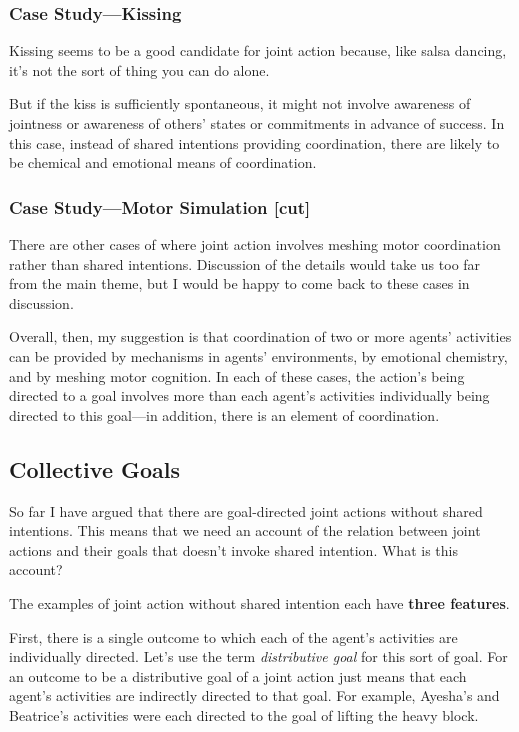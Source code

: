 \documentclass[14pt,a4paper]{extarticle}
\begin{document}
\subsubsection{Case Study---Kissing}
Kissing seems to be a good candidate for joint action because, like salsa dancing, it's not the sort of thing you can do alone.

But if the kiss is sufficiently spontaneous, it might not involve awareness of jointness or awareness of others' states or commitments in advance of success.  In this case, instead of shared intentions providing coordination, there are likely to be chemical and emotional means of coordination.



\subsubsection{Case Study---Motor Simulation [cut]}

There are other cases of where joint action involves meshing motor coordination rather than shared intentions.  Discussion of the details would take us too far from the main theme, but I would be happy to come back to these cases in discussion.

Overall, then, my suggestion is that coordination of two or more agents' activities can be provided by mechanisms in agents' environments, by emotional chemistry, and by meshing motor cognition.  
In each of these cases, the action's being directed to a goal involves more than each agent's activities individually being directed to this goal---in addition, there is an element of coordination.



\subsection{Collective Goals}
\label{section_collective}

So far I have argued that there are goal-directed joint actions without shared intentions.  
This means that we need an account of the relation between joint actions and their goals that doesn't invoke shared intention.
What is this account? 

The examples of joint action without shared intention each have \textbf{three features}.

First, there is a single outcome to which each of the agent's activities are individually directed.  
Let's use the term \emph{distributive goal} for this sort of goal.  For an outcome to be a distributive goal of a joint action just means that each agent's activities are indirectly directed to that goal.
For example, Ayesha's and Beatrice's activities were each directed to the goal of lifting the heavy block.
\end{document}
